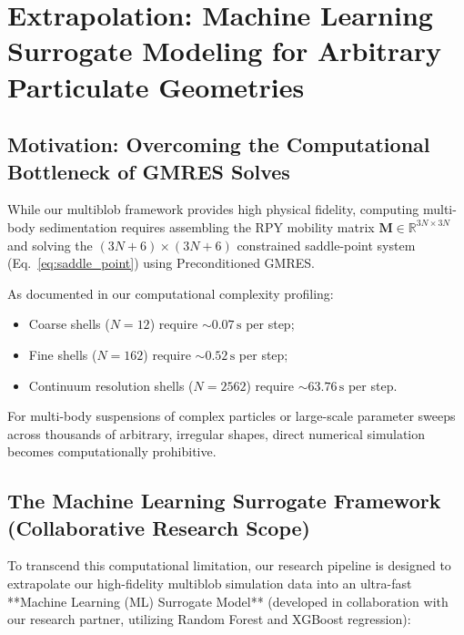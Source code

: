\documentclass[11pt,a4paper]{article}
\begin{document}
\section{Extrapolation: Machine Learning Surrogate Modeling for Arbitrary Particulate Geometries}

\subsection{Motivation: Overcoming the Computational Bottleneck of GMRES Solves}
While our multiblob framework provides high physical fidelity, computing multi-body sedimentation requires assembling the RPY mobility matrix $\mathbf{M} \in \mathbb{R}^{3N \times 3N}$ and solving the $(3N + 6) \times (3N + 6)$ constrained saddle-point system (Eq.~\ref{eq:saddle_point}) using Preconditioned GMRES. 

As documented in our computational complexity profiling:
\begin{itemize}
    \item Coarse shells ($N = 12$) require $\sim 0.07\,\text{s}$ per step;
    \item Fine shells ($N = 162$) require $\sim 0.52\,\text{s}$ per step;
    \item Continuum resolution shells ($N = 2562$) require $\sim 63.76\,\text{s}$ per step.
\end{itemize}
For multi-body suspensions of complex particles or large-scale parameter sweeps across thousands of arbitrary, irregular shapes, direct numerical simulation becomes computationally prohibitive.

\subsection{The Machine Learning Surrogate Framework (Collaborative Research Scope)}
To transcend this computational limitation, our research pipeline is designed to extrapolate our high-fidelity multiblob simulation data into an ultra-fast **Machine Learning (ML) Surrogate Model** (developed in collaboration with our research partner, utilizing Random Forest and XGBoost regression):
\end{document}
